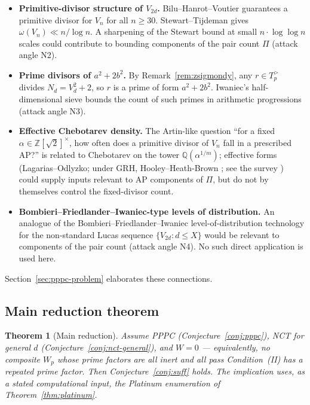 \documentclass[11pt]{amsart}
\theoremstyle{plain}
\newtheorem{theorem}{Theorem}[section]
\theoremstyle{definition}
\theoremstyle{remark}
\numberwithin{equation}{section}
\newcommand{\Z}{\mathbb{Z}}
\newcommand{\Q}{\mathbb{Q}}
\begin{document}
\begin{itemize}
\item \textbf{Primitive-divisor structure of $V_{2 d}$.} Bilu--Hanrot--Voutier \cite{ref:BHV} guarantees a primitive divisor for $V_n$ for all $n \geq 30$. Stewart--Tijdeman \cite{ref:Stewart} gives $\omega(V_n) \ll n / \log n$. A sharpening of the Stewart bound at small $n \cdot \log \log n$ scales could contribute to bounding components of the pair count $\Pi$ (attack angle N2).

\item \textbf{Prime divisors of $a^2 + 2 b^2$.} By Remark~\ref{rem:zsigmondy}, any $r \in T_p^{>}$ divides $N_d = V_d^2 + 2$, so $r$ is a prime of form $a^2 + 2 b^2$. Iwaniec's half-dimensional sieve \cite{ref:Iwaniec} bounds the count of such primes in arithmetic progressions (attack angle N3).

\item \textbf{Effective Chebotarev density.} The Artin-like question ``for a fixed $\alpha \in \Z[\sqrt 2]^\times$, how often does a primitive divisor of $V_n$ fall in a prescribed AP?'' is related to Chebotarev on the tower $\Q(\alpha^{1/m})$; effective forms (Lagarias--Odlyzko; under GRH, Hooley--Heath-Brown \cite{ref:Hooley, ref:HeathBrown}; see the survey \cite{ref:Moree}) could supply inputs relevant to AP components of $\Pi$, but do not by themselves control the fixed-divisor count.

\item \textbf{Bombieri--Friedlander--Iwaniec-type levels of distribution.} An analogue of the Bombieri--Friedlander--Iwaniec level-of-distribution technology for the non-standard Lucas sequence $\{V_{2 d} : d \leq X\}$ would be relevant to components of the pair count (attack angle N4). No such direct application is used here.
\end{itemize}

Section~\ref{sec:pppc-problem} elaborates these connections.

\subsection{Main reduction theorem}\label{sec:main-reduction}

\begin{theorem}[Main reduction]\label{thm:main}
Assume PPPC (Conjecture~\ref{conj:pppc}), NCT for general $d$ (Conjecture~\ref{conj:nct-general}), and $W = 0$ --- equivalently, no composite $W_p$ whose prime factors are all inert and all pass Condition~(II) has a repeated prime factor. Then Conjecture~\ref{conj:suff} holds. The implication uses, as a stated computational input, the Platinum enumeration of Theorem~\ref{thm:platinum}.
\end{theorem}
\end{document}
